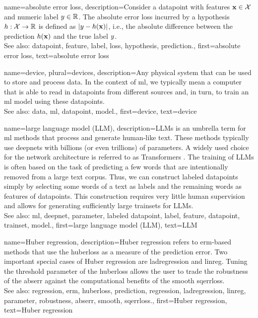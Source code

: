 {name={absolute error loss},
	description={Consider a \gls{datapoint} with \glspl{feature} ${\bf x} \in \mathcal{X}$ and numeric 
		\gls{label} $y \in \mathbb{R}$. The absolute error \gls{loss} 
		incurred by a \gls{hypothesis} $h: \mathcal{X} \rightarrow \mathbb{R}$ 
		is defined as $|y - h({\bf x})|$, i.e., the absolute difference between 
		the \gls{prediction} $h({\bf x})$ and the true \gls{label} $y$.
					\\
		See also: \gls{datapoint}, \gls{feature}, \gls{label}, \gls{loss}, \gls{hypothesis}, \gls{prediction}.},
	first={absolute error loss},
	text={absolute error loss}
}

{name={device}, plural={devices}, 
	description={Any physical system that can be used to store and process \gls{data}. In the context of \gls{ml}, 
		we typically mean a computer that is able to read in \glspl{datapoint} from different 
		sources and, in turn, to train an \gls{ml} \gls{model} using these \glspl{datapoint}.
						\\
		See also: \gls{data}, \gls{ml}, \gls{datapoint}, \gls{model}.},
	first={device},
	text={device}
}

{name={large language model (LLM)},
	description={LLMs is an umbrella term for \gls{ml} methods 
		that process and generate human-like text. These methods typically 
		use \glspl{deepnet} with billions (or even trillions) of \glspl{parameter}. 
		A widely used choice for the network architecture is referred to as 
		Transformers \cite{vaswani2017attention}. The training of LLMs is often  
		based on the task of predicting a few words that are intentionally removed 
		from a large text corpus. Thus, we can construct \glspl{labeled datapoint} 
		simply by selecting some words of a text as \glspl{label} and the remaining 
		words as \glspl{feature} of \glspl{datapoint}. This construction requires 
		very little human supervision and allows for generating sufficiently 
		large \glspl{trainset} for LLMs.
			\\
		See also: \gls{ml}, \gls{deepnet}, \gls{parameter}, \gls{labeled datapoint}, \gls{label}, \gls{feature}, \gls{datapoint}, \gls{trainset}, \gls{model}.},
	first={large language model (LLM)},
	text={LLM}
}


{name={Huber regression},
	description={Huber \gls{regression} refers to \gls{erm}-based methods 
		that use the \gls{huberloss} as a measure of the \gls{prediction} error. 
		Two important special cases of Huber \gls{regression} are \gls{ladregression} and 
		\gls{linreg}. Tuning the threshold \gls{parameter} of the \gls{huberloss} allows the user
		to trade the \gls{robustness} of the \gls{abserr} 
		against the computational benefits of the \gls{smooth} \gls{sqerrloss}.
					\\
		See also: \gls{regression}, \gls{erm}, \gls{huberloss}, \gls{prediction}, \gls{regression}, \gls{ladregression}, \gls{linreg}, \gls{parameter}, \gls{robustness}, \gls{abserr}, \gls{smooth}, \gls{sqerrloss}.},
	first={Huber regression},
	text={Huber regression}
}



